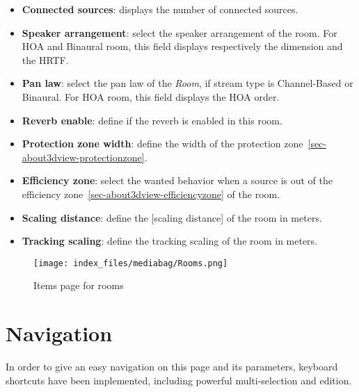 \documentclass[
  letterpaper,
  DIV=11,
  numbers=noendperiod]{scrreport}
\providecommand{\tightlist}{%
  \setlength{\itemsep}{0pt}\setlength{\parskip}{0pt}}\usepackage{longtable,booktabs,array}
\begin{document}
\begin{itemize}
\tightlist
\item
  \textbf{Connected sources}: displays the number of connected sources.
\item
  \textbf{Speaker arrangement}: select the speaker arrangement of the
  room. For HOA and Binaural room, this field displays respectively the
  dimension and the HRTF.
\item
  \textbf{Pan law}: select the pan law of the \emph{Room}, if stream
  type is Channel-Based or Binaural. For HOA room, this field displays
  the HOA order.
\item
  \textbf{Reverb enable}: define if the reverb is enabled in this room.
\item
  \textbf{Protection zone width}: define the width of the protection
  zone~\ref{sec-about3dview-protectionzone}.
\item
  \textbf{Efficiency zone}: select the wanted behavior when a source is
  out of the efficiency zone~\ref{sec-about3dview-efficiencyzone} of the
  room.
\item
  \textbf{Scaling distance}: define the {[}scaling distance{]} of the
  room in meters.
\item
  \textbf{Tracking scaling}: define the tracking scaling of the room in
  meters.
\end{itemize}

\begin{figure}

{\centering \texttt{[image: index\_files/mediabag/Rooms.png]}

}

\caption{Items page for rooms}

\end{figure}

\hypertarget{navigation}{%
\section{Navigation}\label{navigation}}

In order to give an easy navigation on this page and its parameters,
keyboard shortcuts have been implemented, including powerful
multi-selection and edition.
\end{document}
